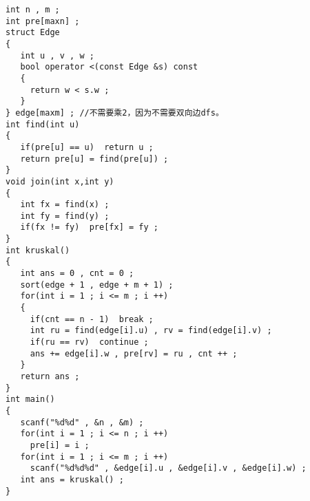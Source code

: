 \documentclass[E:/GsjzTle/main/main.tex]{subfiles}
\begin{document}
\begin{lstlisting}
int n , m ;
int pre[maxn] ;
struct Edge
{
   int u , v , w ;
   bool operator <(const Edge &s) const
   {
     return w < s.w ;
   }
} edge[maxm] ; //不需要乘2，因为不需要双向边dfs。
int find(int u) 
{
   if(pre[u] == u)  return u ;
   return pre[u] = find(pre[u]) ;
}
void join(int x,int y)
{
   int fx = find(x) ;
   int fy = find(y) ;
   if(fx != fy)  pre[fx] = fy ;
}
int kruskal()
{
   int ans = 0 , cnt = 0 ;
   sort(edge + 1 , edge + m + 1) ;
   for(int i = 1 ; i <= m ; i ++)
   {
     if(cnt == n - 1)  break ;
     int ru = find(edge[i].u) , rv = find(edge[i].v) ;
     if(ru == rv)  continue ;
     ans += edge[i].w , pre[rv] = ru , cnt ++ ;
   }
   return ans ;
}
int main()
{
   scanf("%d%d" , &n , &m) ;
   for(int i = 1 ; i <= n ; i ++)
     pre[i] = i ;
   for(int i = 1 ; i <= m ; i ++)
     scanf("%d%d%d" , &edge[i].u , &edge[i].v , &edge[i].w) ;
   int ans = kruskal() ;
}
\end{lstlisting}
\end{document}

